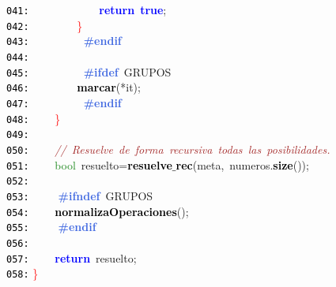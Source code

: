 \documentclass[a4paper,10pt]{scrartcl}
\begin{document}
{   \mbox{}\texttt{\textcolor{Black}{041:}} \ \ \ \ \ \ \ \ \ \ \ \ \textbf{\textcolor{Blue}{return}}\ \textbf{\textcolor{Blue}{true}}\textcolor{BrickRed}{;} \\
   \mbox{}\texttt{\textcolor{Black}{042:}} \ \ \ \ \ \ \ \ \textcolor{Red}{\}} \\
   \mbox{}\texttt{\textcolor{Black}{043:}} \textbf{\textcolor{RoyalBlue}{\ \ \ \ \ \ \ \ \#endif}} \\
   \mbox{}\texttt{\textcolor{Black}{044:}} \ \ \ \  \\
   \mbox{}\texttt{\textcolor{Black}{045:}} \textbf{\textcolor{RoyalBlue}{\ \ \ \ \ \ \ \ \#ifdef}}\ GRUPOS \\
   \mbox{}\texttt{\textcolor{Black}{046:}} \ \ \ \ \ \ \ \ \textbf{\textcolor{Black}{marcar}}\textcolor{BrickRed}{(*}it\textcolor{BrickRed}{);} \\
   \mbox{}\texttt{\textcolor{Black}{047:}} \textbf{\textcolor{RoyalBlue}{\ \ \ \ \ \ \ \ \#endif}} \\
   \mbox{}\texttt{\textcolor{Black}{048:}} \ \ \ \ \textcolor{Red}{\}} \\
   \mbox{}\texttt{\textcolor{Black}{049:}} \ \  \\
   \mbox{}\texttt{\textcolor{Black}{050:}} \ \ \ \ \textit{\textcolor{Brown}{//\ Resuelve\ de\ forma\ recursiva\ todas\ las\ posibilidades.}} \\
   \mbox{}\texttt{\textcolor{Black}{051:}} \ \ \ \ \textcolor{ForestGreen}{bool}\ resuelto\textcolor{BrickRed}{=}\textbf{\textcolor{Black}{resuelve$\_$rec}}\textcolor{BrickRed}{(}meta\textcolor{BrickRed}{,}\ numeros\textcolor{BrickRed}{.}\textbf{\textcolor{Black}{size}}\textcolor{BrickRed}{());} \\
   \mbox{}\texttt{\textcolor{Black}{052:}} \ \  \\
   \mbox{}\texttt{\textcolor{Black}{053:}} \textbf{\textcolor{RoyalBlue}{\ \ \ \ \#ifndef}}\ GRUPOS \\
   \mbox{}\texttt{\textcolor{Black}{054:}} \ \ \ \ \textbf{\textcolor{Black}{normalizaOperaciones}}\textcolor{BrickRed}{();} \\
   \mbox{}\texttt{\textcolor{Black}{055:}} \textbf{\textcolor{RoyalBlue}{\ \ \ \ \#endif}} \\
   \mbox{}\texttt{\textcolor{Black}{056:}} \ \  \\
   \mbox{}\texttt{\textcolor{Black}{057:}} \ \ \ \ \textbf{\textcolor{Blue}{return}}\ resuelto\textcolor{BrickRed}{;} \\
   \mbox{}\texttt{\textcolor{Black}{058:}} \textcolor{Red}{\}} \\
}
\end{document}
